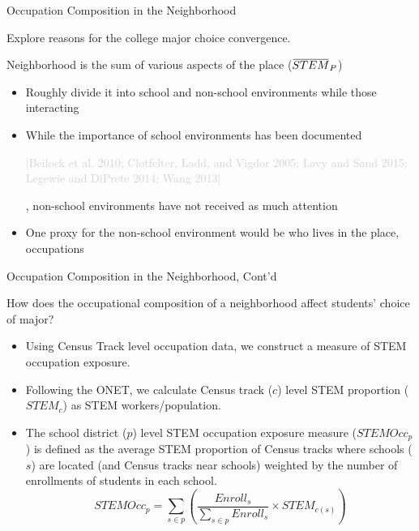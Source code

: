 \documentclass[aspectratio=169,xcolor=dvipsnames]{beamer}
\newcommand{\overbar}[1]{\mkern 1.5mu\overline{\mkern-1.5mu#1\mkern-1.5mu}\mkern 1.5mu}
\newenvironment{wideitemize}{\itemize\addtolength{\itemsep}{10pt}}{\enditemize}
\begin{document}
\begin{frame}{Occupation Composition in the Neighborhood}
\begin{wideitemize}
    \item Explore reasons for the college major choice convergence.
    \item Neighborhood is the sum of various aspects of the place ($\overbar{STEM}_P$)
    \begin{itemize}
        \item Roughly divide it into school and non-school environments while those interacting
        \item While the importance of school environments has been documented \begin{scriptsize} \textcolor{lightgray}{[Beilock et al. 2010; Clotfelter, Ladd, and Vigdor 2005; Lavy and Sand 2015; Legewie and DiPrete 2014; Wang 2013]}\end{scriptsize}, non-school environments have not received as much attention
        \item One proxy for the non-school environment would be who lives in the place, occupations
    \end{itemize} 
\end{wideitemize}
\end{frame}

\begin{frame}{Occupation Composition in the Neighborhood, Cont'd}
\begin{wideitemize}
    \item How does the occupational composition of a neighborhood affect students' choice of major?
    \begin{itemize}
        \item Using Census Track level occupation data, we construct a measure of STEM occupation exposure. 
        \item Following the ONET, we calculate Census track ($c$) level STEM proportion ($STEM_c$) as STEM workers/population. 
        \item The school district ($p$) level STEM occupation exposure measure ($STEMOcc_p$) is defined as the average STEM proportion of Census tracks where schools ($s$) are located (and Census tracks near schools) weighted by the number of enrollments of students in each school.
        $$STEMOcc_p = \sum_{s\in p} \left( \frac{Enroll_s}{\sum_{s\in p} Enroll_s}\times STEM_{c(s)} \right)$$
    \end{itemize}
\end{wideitemize}
\end{frame}
\end{document}
